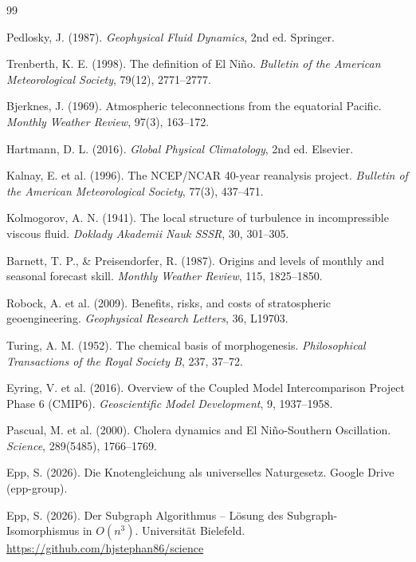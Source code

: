 ﻿\documentclass[a4paper,12pt]{article}
\theoremstyle{definition}
\begin{document}
\begin{thebibliography}{99}

Pedlosky, J. (1987).
\textit{Geophysical Fluid Dynamics}, 2nd ed.
Springer.

Trenberth, K. E. (1998).
The definition of El Ni\~no.
\textit{Bulletin of the American Meteorological Society}, 79(12), 2771--2777.

Bjerknes, J. (1969).
Atmospheric teleconnections from the equatorial Pacific.
\textit{Monthly Weather Review}, 97(3), 163--172.

Hartmann, D. L. (2016).
\textit{Global Physical Climatology}, 2nd ed.
Elsevier.

Kalnay, E. et al. (1996).
The NCEP/NCAR 40-year reanalysis project.
\textit{Bulletin of the American Meteorological Society}, 77(3), 437--471.

Kolmogorov, A. N. (1941).
The local structure of turbulence in incompressible viscous fluid.
\textit{Doklady Akademii Nauk SSSR}, 30, 301--305.

Barnett, T. P., \& Preisendorfer, R. (1987).
Origins and levels of monthly and seasonal forecast skill.
\textit{Monthly Weather Review}, 115, 1825--1850.

Robock, A. et al. (2009).
Benefits, risks, and costs of stratospheric geoengineering.
\textit{Geophysical Research Letters}, 36, L19703.

Turing, A. M. (1952).
The chemical basis of morphogenesis.
\textit{Philosophical Transactions of the Royal Society B}, 237, 37--72.

Eyring, V. et al. (2016).
Overview of the Coupled Model Intercomparison Project Phase 6 (CMIP6).
\textit{Geoscientific Model Development}, 9, 1937--1958.

Pascual, M. et al. (2000).
Cholera dynamics and El Ni\~no-Southern Oscillation.
\textit{Science}, 289(5485), 1766--1769.

Epp, S. (2026).
Die Knotengleichung als universelles Naturgesetz.
Google Drive (epp-group).

Epp, S. (2026).
Der Subgraph Algorithmus -- L\"osung des Subgraph-Isomorphismus in $O(n^3)$.
Universit\"at Bielefeld. \url{https://github.com/hjstephan86/science}


\end{thebibliography}
\end{document}
